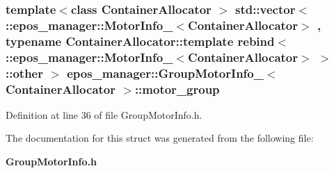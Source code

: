 \subsubsection[{motor\-\_\-group}]{\setlength{\rightskip}{0pt plus 5cm}template$<$class Container\-Allocator $>$ std\-::vector$<$ \-::{\bf epos\-\_\-manager\-::\-Motor\-Info\-\_\-}$<$\-Container\-Allocator$>$ , typename \-Container\-Allocator\-::template rebind$<$ \-::{\bf epos\-\_\-manager\-::\-Motor\-Info\-\_\-}$<$\-Container\-Allocator$>$ $>$\-::other $>$ {\bf epos\-\_\-manager\-::\-Group\-Motor\-Info\-\_\-}$<$ \-Container\-Allocator $>$\-::{\bf motor\-\_\-group}}\label{structepos__manager_1_1GroupMotorInfo___a5d53c4df9193061075bb3767662dd9e4}


\-Definition at line 36 of file \-Group\-Motor\-Info.\-h.



\-The documentation for this struct was generated from the following file\-:\begin{DoxyCompactItemize}
\item 
{\bf \-Group\-Motor\-Info.\-h}\end{DoxyCompactItemize}
